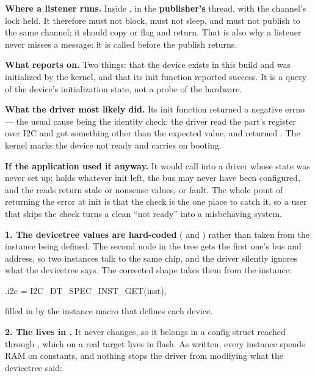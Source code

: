 \textbf{Where a listener runs.} Inside , in the \textbf{publisher's} thread,
with the channel's lock held. It therefore must not block, must not sleep, and must not publish to
the same channel; it should copy or flag and return. That is also why a listener never misses a
message: it is called before the publish returns. 


\textbf{What  reports on.} Two things: that the device exists in this build
and was initialized by the kernel, and that its init function reported success. It is a query of the
device's initialization state, not a probe of the hardware. 

\textbf{What the driver most likely did.} Its init function returned a negative errno --- the usual
cause being the identity check: the driver read the part's  register over I2C and got
something other than the expected value, and returned . The kernel marks the device
not ready and carries on booting. 

\textbf{If the application used it anyway.} It would call into a driver whose state was never set
up:  holds whatever init left, the bus may never have been configured, and the reads
return stale or nonsense values, or fault. The whole point of returning the error at init is that
the check is the one place to catch it, so a user that skips the check turns a clean ``not ready''
into a misbehaving system. 

\textbf{1. The devicetree values are hard-coded} ( and
) rather than taken from the instance being defined. The second node in the tree gets the
first one's bus and address, so two instances talk to the same chip, and the driver silently ignores
what the devicetree says. The corrected shape takes them from the instance:

\begin{ccode}
.i2c = I2C_DT_SPEC_INST_GET(inst),
\end{ccode}

\noindent filled in by the instance macro that defines each device. 

\textbf{2. The  lives in .} It never changes, so it belongs in a
 config struct reached through , which on a real target lives in
flash. As written, every instance spends RAM on constants, and nothing stops the driver from
modifying what the devicetree said:

